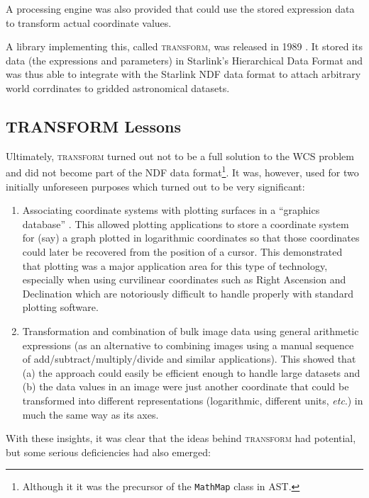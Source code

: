 \documentclass[final,authoryear,5p,times,twocolumn]{elsarticle}
\begin{document}
A processing engine was also provided that could use the stored
expression data to transform actual coordinate values.

A library implementing this, called \textsc{transform}, was released
in 1989 \citep{SUN61,1989StarB...4....7L}. It stored its data (the
expressions and parameters) in Starlink's Hierarchical Data Format
\citep[HDS;][]{SUN92,SSN27} and was thus able to integrate with the
Starlink NDF data format to attach arbitrary world corrdinates to
gridded astronomical datasets.


\subsection{TRANSFORM Lessons}

Ultimately, \textsc{transform} turned out not to be a full solution to
the WCS problem and did not become part of the NDF data
format\footnote{Although it it was the precursor of the
  \texttt{MathMap} class in AST.}. It was, however, used for two
initially unforeseen purposes which turned out to be very significant:

\begin{enumerate}
\item Associating coordinate systems with plotting surfaces in a
  ``graphics database'' \citep[see e.g.,][]{SUN48}. This allowed
  plotting applications to store a coordinate system for (say) a graph
  plotted in logarithmic coordinates so that those coordinates could
  later be recovered from the position of a cursor. This demonstrated
  that plotting was a major application area for this type of
  technology, especially when using curvilinear coordinates such as
  Right Ascension and Declination which are notoriously difficult to
  handle properly with standard plotting software.

\item Transformation and combination of bulk image data using general
  arithmetic expressions (as an alternative to combining images using
  a manual sequence of add/subtract/multiply/divide and similar
  applications). This showed that (a) the approach could easily be
  efficient enough to handle large datasets and (b) the data values in
  an image were just another coordinate that could be transformed into
  different representations (logarithmic, different units, \emph{etc}.) in
  much the same way as its axes.
\end{enumerate}

With these insights, it was clear that the ideas behind
\textsc{transform} had potential, but some serious deficiencies had
also emerged:
\end{document}
